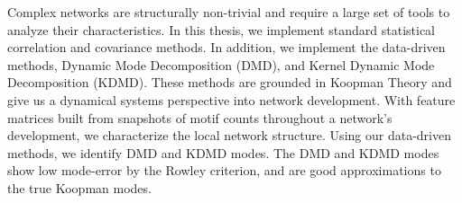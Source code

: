 

Complex networks are structurally non-trivial and require a large set of
tools to analyze their characteristics. In this thesis, we implement standard statistical correlation and
covariance methods. In addition, we implement the data-driven methods, Dynamic Mode Decomposition (DMD), and Kernel
Dynamic Mode Decomposition (KDMD). These methods are grounded in Koopman Theory and give us a dynamical systems perspective into 
network development. With feature matrices built from snapshots of motif counts throughout a 
network's development, we 
characterize the local network structure. Using our data-driven methods, we identify DMD and KDMD modes. The DMD and KDMD
modes show low mode-error by the Rowley criterion, and are good approximations to the true Koopman modes.


